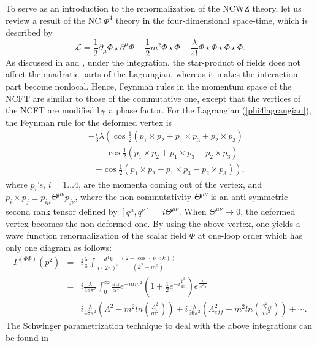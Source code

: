 \documentclass[a4paper,a4paper]{article}
\begin{document}
To serve as an introduction to the renormalization of the NCWZ theory, 
let us review a result of the NC $\Phi^4$ theory in the four-dimensional space-time, 
which is described by
\begin{equation}
\mathcal{L} = \frac {1}{2} \partial_\mu \Phi\star\partial^\mu\Phi -\frac 12 m^2 \Phi\star\Phi 
- \frac \lambda{4!}\Phi\star\Phi\star\Phi\star\Phi. 
\label{phi4lagrangian}
\end{equation} 
As discussed in \cite{Filk} \cite{SW} and \cite{MRS}, 
under the integration, the star-product of fields does not 
affect the quadratic parts of the Lagrangian, whereas it makes the interaction part 
become nonlocal. Hence, Feynman rules in the momentum space of the NCFT  
are similar to those of the commutative one, except that the vertices of the NCFT 
are modified by a phase factor. For the Lagrangian (\ref{phi4lagrangian}),
the Feynman rule for the deformed vertex is
\begin{eqnarray}
& &-\frac i{3} \lambda
\left(\cos\frac 12(p_1\times p_2 + p_1\times p_3 + p_2\times p_3)\right.\nonumber\\
& &~~~~+ \cos\frac 12(p_1\times p_2 + p_1\times p_3 - p_2\times p_3)\nonumber\\
& &~~~~\left.+\cos\frac 12(p_1\times p_2 - p_1\times p_3 - p_2\times p_3)\right),
\end{eqnarray}
where $p_i$'s, $i=1\dots 4$, are the momenta coming out of the vertex, and 
$p_i\times p_j\equiv p_{i\mu}\Theta^{\mu\nu}p_{j\nu}$, where the non-commutativity 
$\Theta^{\mu\nu}$ is an anti-symmetric second rank tensor 
defined by $[q^\mu,q^\nu] = i\Theta^{\mu\nu}$. When $\Theta^{\mu\nu}\rightarrow 0$,
the deformed vertex becomes the non-deformed one. By using the above vertex, 
one yields a wave function renormalization of the scalar field $\Phi$ at one-loop order 
which has only one diagram as follows:
\begin{eqnarray}
\Gamma^{(\Phi\Phi)}(p^2) & = & i\frac \lambda6\int 
\frac{d^4k}{i(2\pi)^4}\frac{(2+\cos(p\times k))}{(k^2+m^2)}\nonumber\\
& = & i\frac{\lambda}{48\pi^2}\int_0^\infty \frac{d\alpha}{\alpha^2}e^{-i\alpha m^2}
\left(1+\frac 12 e^{-i\frac{\tilde{p}^2}{4\alpha}}\right)e^{\frac i{\Lambda^2\alpha}}\nonumber\\
& = & i\frac{\lambda}{48\pi^2}\left(\Lambda^2 - m^2ln(\frac{\Lambda^2}{m^2})\right)
+ i\frac{\lambda}{96\pi^2}\left(\Lambda_{eff}^2 - m^2ln(\frac{\Lambda_{eff}^2}{m^2})\right) 
+ \cdots.
\end{eqnarray}
The Schwinger parametrization technique to deal with the above integrations can be found in 
\end{document}
